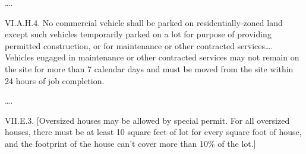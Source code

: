 \ldots.

VI.A.H.4. No commercial vehicle shall be parked on residentially-zoned land
except such vehicles temporarily parked on a lot for purpose of providing
permitted construction, or for maintenance or other contracted services\ldots.
Vehicles engaged in maintenance or other contracted services may not remain on
the site for more than 7 calendar days and must be moved from the site within 24
hours of job completion.

\ldots.

VII.E.3. [Oversized houses may be allowed by special permit. For all oversized
houses, there must be at least 10 square feet of lot for every square foot of
house, and the footprint of the house can't cover more than 10\% of the lot.]
